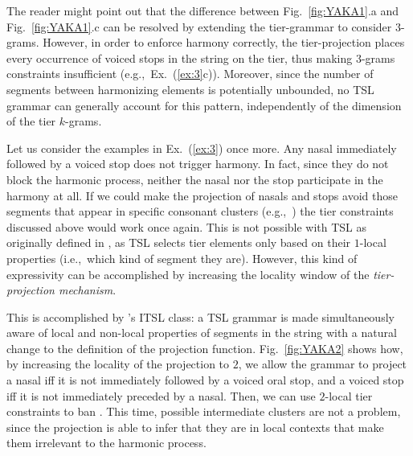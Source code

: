 \documentclass[11pt,a4paper]{article}
\begin{document}
The reader might point out that the difference between Fig.~\ref{fig:YAKA1}.a and Fig.~\ref{fig:YAKA1}.c can be resolved by extending the tier-grammar to consider $3$-grams.
However, in order to enforce harmony correctly, the tier-projection places every occurrence of voiced stops in the string on the tier, thus making $3$-grams constraints insufficient (e.g.,~Ex.~(\ref{ex:3}c)).
Moreover, since the number of segments between harmonizing elements is potentially unbounded, no TSL grammar can generally account for this pattern, independently of the dimension of the tier $k$-grams.

Let us consider the examples in Ex.~(\ref{ex:3}) once more. 
Any nasal immediately followed by a voiced stop does not trigger harmony. 
In fact, since they do not block the harmonic process, neither the nasal nor the stop participate in the harmony at all.
If we could make the projection of nasals and stops avoid  those segments that appear in specific consonant clusters (e.g.,~\textipa{[nd]}) the tier constraints discussed above would work once again.
This is not possible with TSL as originally defined in \cite{HeinzRawalTanner}, as TSL selects tier elements only based on their $1$-local properties (i.e.,~which kind of segment they are). %
However, this kind of expressivity can be accomplished by increasing the locality window of the \emph{tier-projection mechanism}. 

This is accomplished by \citet{desanto2019structure}'s ITSL class: a TSL grammar is made simultaneously aware of local and non-local properties of segments in the string with a natural change to the definition of the projection function.
Fig.~\ref{fig:YAKA2} shows how, by increasing the locality of the projection to $2$, we allow the grammar to project a nasal iff it is not immediately followed by a voiced oral stop, and a voiced stop iff it is not immediately preceded by a nasal.
Then, we can use $2$-local tier constraints to ban  \textipa{[nd]}.
This time,  possible intermediate clusters are not a problem, since the projection is able to infer that they are in local contexts that make them irrelevant to the harmonic process.
\end{document}
